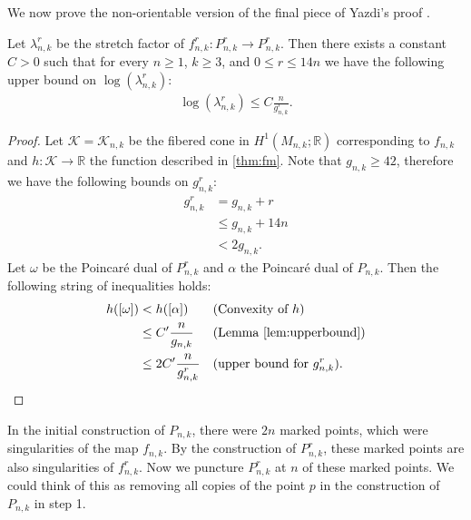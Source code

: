 We now prove the non-orientable version of the final piece of Yazdi's proof \cite[Lemma 3.6]{yazdi2018pseudo}.
\begin{lem}
\label{lem:bound}
Let $\lambda_{n,k}^r$ be the stretch factor of $f_{n,k}^r:P_{n,k}^r\rightarrow P_{n,k}^r$. Then there exists a constant $C > 0$ such that for every $n \geq 1$, $k \geq 3$, and $0 \leq r \leq 14n$ we have the following upper bound on $\log(\lambda_{n,k}^r)$:
\begin{align*}
  \log(\lambda^r_{n,k}) \leq C\frac{n}{g^r_{n,k}}.
\end{align*}
\end{lem}
\begin{proof}
  Let $\mathcal{K} = \mathcal{K}_{n,k}$ be the fibered cone in $H^1(M_{n,k};\mathbb{R})$ corresponding to $f_{n,k}$ and $h: \mathcal{K} \xrightarrow[]{} \mathbb{R}$
  the function described in \autoref{thm:fm}. Note that $g_{n,k}\geq 42$, therefore we have the following bounds on $g_{n,k}^r$:
  \begin{align*}
    g^r_{n,k} &= g_{n,k} + r \\
              &\leq g_{n,k} + 14n \\
              &< 2g_{n,k}.
  \end{align*}
  Let $\omega$ be the Poincar\'e dual of $P^r_{n,k}$ and $\alpha$ the Poincar\'e dual of $P_{n,k}$.  Then the following string of inequalities holds:
  \begin{align*}
    h([\omega]) &< h([\alpha]) &&\text{(Convexity of $h$)}\\
                &\leq C'\frac{n}{g_{n,k}} &&\text{(Lemma \ref{lem:upperbound})}\\
                &\leq 2C'\frac{n}{g^r_{n,k}}&&\text{(upper bound for $g_{n,k}^r$)}.\qedhere
  \end{align*}
\end{proof}


In the initial construction of $P_{n,k}$, there were $2n$  marked points, which were singularities of the map $f_{n,k}$.  By the construction of $P_{n,k}^r$, these marked points are also singularities of $f^r_{n,k}$.  Now we puncture $P_{n,k}^r$ at $n$ of these marked points.  We could think of this as removing all copies of the point $p$ in the construction of $P_{n,k}$ in step 1. %

